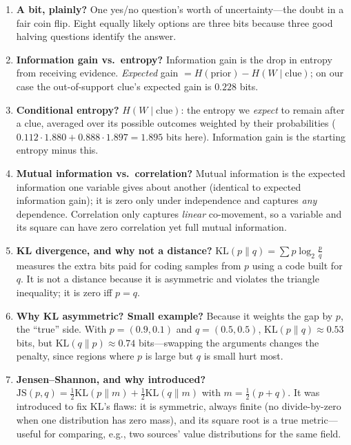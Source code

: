\documentclass[11pt]{article}
\begin{document}
\begin{enumerate}[itemsep=3pt]
\item \textbf{A bit, plainly?} One yes/no question's worth of uncertainty---the doubt in
a fair coin flip. Eight equally likely options are three bits because three good
halving questions identify the answer.

\item \textbf{Information gain vs.\ entropy?} Information gain is the drop in entropy
from receiving evidence. \emph{Expected} gain $=H(\text{prior})-H(W\mid\text{clue})$;
on our case the out-of-support clue's expected gain is $0.228$ bits.

\item \textbf{Conditional entropy?} $H(W\mid\text{clue})$: the entropy we \emph{expect}
to remain after a clue, averaged over its possible outcomes weighted by their
probabilities ($0.112\cdot1.880+0.888\cdot1.897=1.895$ bits here). Information gain is
the starting entropy minus this.

\item \textbf{Mutual information vs.\ correlation?} Mutual information is the expected
information one variable gives about another (identical to expected information gain);
it is zero only under independence and captures \emph{any} dependence. Correlation only
captures \emph{linear} co-movement, so a variable and its square can have zero
correlation yet full mutual information.

\item \textbf{KL divergence, and why not a distance?} $\mathrm{KL}(p\|q)=\sum p\log_2
\tfrac{p}{q}$ measures the extra bits paid for coding samples from $p$ using a code
built for $q$. It is not a distance because it is asymmetric and violates the triangle
inequality; it is zero iff $p=q$.

\item \textbf{Why KL asymmetric? Small example?} Because it weights the gap by $p$, the
``true'' side. With $p=(0.9,0.1)$ and $q=(0.5,0.5)$, $\mathrm{KL}(p\|q)\approx0.53$
bits, but $\mathrm{KL}(q\|p)\approx0.74$ bits---swapping the arguments changes the
penalty, since regions where $p$ is large but $q$ is small hurt most.

\item \textbf{Jensen--Shannon, and why introduced?} $\mathrm{JS}(p,q)=\tfrac12
\mathrm{KL}(p\|m)+\tfrac12\mathrm{KL}(q\|m)$ with $m=\tfrac12(p+q)$. It was introduced
to fix KL's flaws: it is symmetric, always finite (no divide-by-zero when one
distribution has zero mass), and its square root is a true metric---useful for
comparing, e.g., two sources' value distributions for the same field.


\end{enumerate}
\end{document}
